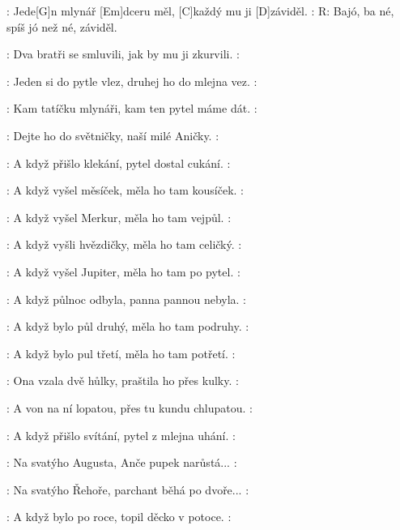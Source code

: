 

: Jede[G]n mlynář [Em]dceru měl, [C]každý mu ji [D]záviděl. : 
R:        Bajó, ba né, spíš jó než né, záviděl. 

: Dva bratři se smluvili, jak by mu ji zkurvili. : 

: Jeden si do pytle vlez, druhej ho do mlejna vez. : 

: Kam tatíčku mlynáři, kam ten pytel máme dát. : 

: Dejte ho do světničky, naší milé Aničky. :   

: A když přišlo klekání, pytel dostal cukání. : 

: A když vyšel měsíček, měla ho tam kousíček. : 

: A když vyšel Merkur, měla ho tam vejpůl. : 

: A když vyšli hvězdičky, měla ho tam celičký. : 

: A když vyšel Jupiter, měla ho tam po pytel. : 

: A když půlnoc odbyla, panna pannou nebyla. :

: A když bylo půl druhý, měla ho tam podruhy. : 

: A když bylo pul třetí, měla ho tam potřetí. : 

: Ona vzala dvě hůlky, praštila ho přes kulky. :

: A von na ní lopatou, přes tu kundu chlupatou. :

: A když přišlo svítání, pytel z mlejna uhání. : 

: Na svatýho Augusta, Anče pupek narůstá... :

: Na svatýho Řehoře, parchant běhá po dvoře... :

: A když bylo po roce, topil děcko v potoce. : 
